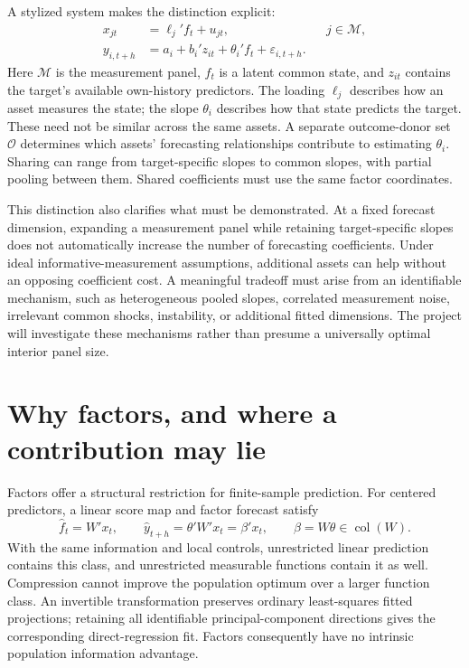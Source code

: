 \documentclass[11pt]{article}
\newcommand{\M}{\mathcal{M}}
\newcommand{\Oset}{\mathcal{O}}
\begin{document}
A stylized system makes the distinction explicit:
\begin{equation}
\begin{aligned}
 x_{jt}&=\ell_j'f_t+u_{jt}, &&j\in\M,\\
 y_{i,t+h}&=a_i+b_i'z_{it}+\theta_i'f_t+\varepsilon_{i,t+h}.
\end{aligned} \label{eq:system}
\end{equation}
Here $\M$ is the measurement panel, $f_t$ is a latent common state, and $z_{it}$ contains the target's available own-history predictors. The loading $\ell_j$ describes how an asset measures the state; the slope $\theta_i$ describes how that state predicts the target. These need not be similar across the same assets. A separate outcome-donor set $\Oset$ determines which assets' forecasting relationships contribute to estimating $\theta_i$. Sharing can range from target-specific slopes to common slopes, with partial pooling between them. Shared coefficients must use the same factor coordinates.

This distinction also clarifies what must be demonstrated. At a fixed forecast dimension, expanding a measurement panel while retaining target-specific slopes does not automatically increase the number of forecasting coefficients. Under ideal informative-measurement assumptions, additional assets can help without an opposing coefficient cost. A meaningful tradeoff must arise from an identifiable mechanism, such as heterogeneous pooled slopes, correlated measurement noise, irrelevant common shocks, instability, or additional fitted dimensions. The project will investigate these mechanisms rather than presume a universally optimal interior panel size.

\section{Why factors, and where a contribution may lie}
Factors offer a structural restriction for finite-sample prediction. For centered predictors, a linear score map and factor forecast satisfy
\begin{equation}
 \widehat f_t=W'x_t,\qquad
 \widehat y_{t+h}=\theta'W'x_t=\beta'x_t,
 \qquad \beta=W\theta\in\operatorname{col}(W). \label{eq:restriction}
\end{equation}
With the same information and local controls, unrestricted linear prediction contains this class, and unrestricted measurable functions contain it as well. Compression cannot improve the population optimum over a larger function class. An invertible transformation preserves ordinary least-squares fitted projections; retaining all identifiable principal-component directions gives the corresponding direct-regression fit. Factors consequently have no intrinsic population information advantage.
\end{document}
